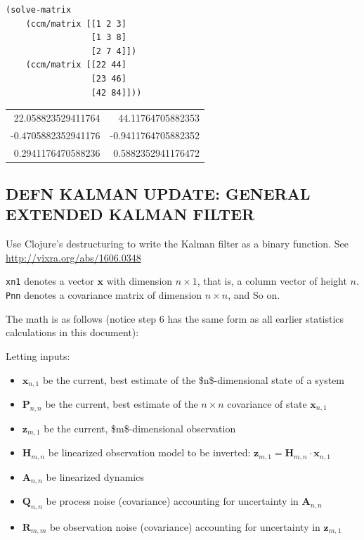 \documentclass[10pt,oneside,x11names]{article}
\begin{document}
\begin{verbatim}
(solve-matrix
    (ccm/matrix [[1 2 3]
                 [1 3 8]
                 [2 7 4]])
    (ccm/matrix [[22 44]
                 [23 46]
                 [42 84]]))
\end{verbatim}

\begin{center}
\begin{tabular}{rr}
22.058823529411764 & 44.11764705882353\\
-0.4705882352941176 & -0.9411764705882352\\
0.2941176470588236 & 0.5882352941176472\\
\end{tabular}
\end{center}

\subsection{DEFN KALMAN UPDATE: GENERAL EXTENDED KALMAN FILTER}
\label{general-extended-kalman-filter}
Use Clojure's destructuring to write the Kalman filter as a binary
function. See \url{http://vixra.org/abs/1606.0348}

\texttt{xn1} denotes a vector \(\boldsymbol{x}\) with dimension \(n\times{1}\),
that is, a column vector of height \(n\). \texttt{Pnn} denotes a covariance
matrix of dimension \(n\times{n}\), and So on.

The math is as follows (notice step 6 has the same form as all earlier
statistics calculations in this document):

Letting inputs:

\begin{itemize}
\item \(\boldsymbol{x}_{n,1}\) be the current, best estimate of the
\$n\$-dimensional state of a system
\item \(\boldsymbol{P}_{n,n}\) be the current, best estimate of the
\(n\times{n}\) covariance of state \(\boldsymbol{x}_{n,1}\)
\item \(\boldsymbol{z}_{m,1}\) be the current, \$m\$-dimensional observation
\item \(\boldsymbol{H}_{m,n}\) be linearized observation model to be inverted:
\(\boldsymbol{z}_{m,1}=\boldsymbol{H}_{m,n}\cdot\boldsymbol{x}_{n,1}\)
\item \(\boldsymbol{A}_{n,n}\) be linearized dynamics
\item \(\boldsymbol{Q}_{n,n}\) be process noise (covariance) accounting for
uncertainty in \(\boldsymbol{A}_{n,n}\)
\item \(\boldsymbol{R}_{m,m}\) be observation noise (covariance) accounting
for uncertainty in \(\boldsymbol{z}_{m,1}\)
\end{itemize}
\end{document}
